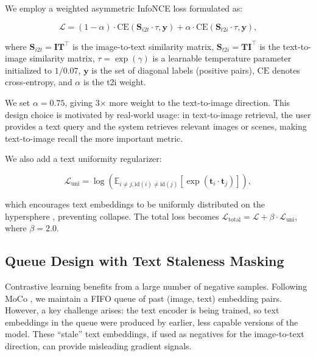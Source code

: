 \documentclass[10pt,leqno]{amsart}
\begin{document}
We employ a weighted asymmetric InfoNCE loss \citep{oord2018representation} formulated as:

\begin{equation}
\mathcal{L} = (1 - \alpha) \cdot \text{CE}(\mathbf{S}_{i2t} \cdot \tau, \mathbf{y}) + \alpha \cdot \text{CE}(\mathbf{S}_{t2i} \cdot \tau, \mathbf{y}),
\label{eq:asymmetric_loss}
\end{equation}

where $\mathbf{S}_{i2t} = \mathbf{I} \mathbf{T}^{\top}$ is the image-to-text similarity matrix, $\mathbf{S}_{t2i} = \mathbf{T} \mathbf{I}^{\top}$ is the text-to-image similarity matrix, $\tau = \exp(\gamma)$ is a learnable temperature parameter initialized to $1/0.07$, $\mathbf{y}$ is the set of diagonal labels (positive pairs), $\text{CE}$ denotes cross-entropy, and $\alpha$ is the t2i weight.

We set $\alpha = 0.75$, giving 3$\times$ more weight to the text-to-image direction. This design choice is motivated by real-world usage: in text-to-image retrieval, the user provides a text query and the system retrieves relevant images or scenes, making text-to-image recall the more important metric.

We also add a text uniformity regularizer:

\begin{equation}
\mathcal{L}_{\text{uni}} = \log\left(\mathbb{E}_{i \neq j, \text{id}(i) \neq \text{id}(j)} \left[\exp(\mathbf{t}_i \cdot \mathbf{t}_j) \right] \right),
\label{eq:uniformity}
\end{equation}

which encourages text embeddings to be uniformly distributed on the hypersphere \citep{wang2020uniformity}, preventing collapse. The total loss becomes $\mathcal{L}_{\text{total}} = \mathcal{L} + \beta \cdot \mathcal{L}_{\text{uni}}$, where $\beta = 2.0$.

\subsection{Queue Design with Text Staleness Masking}

Contrastive learning benefits from a large number of negative samples. Following MoCo \citep{he2020moco}, we maintain a FIFO queue of past (image, text) embedding pairs. However, a key challenge arises: the text encoder is being trained, so text embeddings in the queue were produced by earlier, less capable versions of the model. These ``stale'' text embeddings, if used as negatives for the image-to-text direction, can provide misleading gradient signals.
\end{document}
